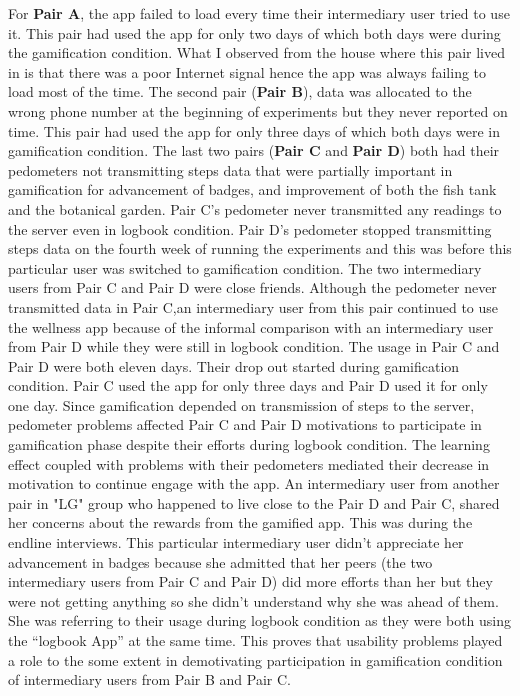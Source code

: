 For \textbf{Pair A}, the app failed to load every time their intermediary user tried to use it. This pair had used the app for only two days  of which both days were during the gamification condition. What I observed from the house where this pair lived in is that there was a poor Internet signal hence the app was always failing to load most of the time. The second pair (\textbf{Pair B}), data was allocated to the wrong phone number at the beginning of experiments but they never reported on time. This pair had used the app for only three days of which both days were in gamification condition.   The last two pairs (\textbf{Pair C} and \textbf{Pair D}) both had their pedometers not transmitting steps data that were partially important in gamification for advancement of badges, and improvement of both the fish tank and the botanical garden. Pair C's pedometer never transmitted any readings to the server even in logbook condition.  Pair D's pedometer stopped transmitting steps data on the fourth week of running the experiments and this was before this particular user was switched to gamification condition. The two intermediary users from Pair C and Pair D were close friends. Although the pedometer never transmitted data in Pair C,an intermediary user from this pair continued to use the wellness app because of the informal comparison with an intermediary user from Pair D while they were still in logbook condition. The usage in Pair C and Pair D were both eleven days. Their drop out started during gamification condition. Pair C used the app for only three days and Pair D used it for only one day. Since gamification depended on transmission of steps to the server, pedometer problems affected Pair C and Pair D motivations to participate in gamification phase despite their efforts during logbook condition. The learning effect coupled with problems with their pedometers mediated their decrease in motivation to continue engage with the app.  An intermediary user from another pair in "LG" group who happened to live close to the Pair D and Pair C, shared her concerns about the rewards from the gamified app. This was during the endline interviews. This particular intermediary user didn't appreciate her advancement in badges because she admitted that her peers (the two intermediary users from Pair C and Pair D) did more efforts than her but they were not getting anything so she didn't understand why she was ahead of them. She was referring to their usage during logbook condition as they were both using the ``logbook App'' at the same time.  This proves that usability problems played a role to the some extent in demotivating participation in gamification condition  of intermediary users from Pair B and Pair C.

